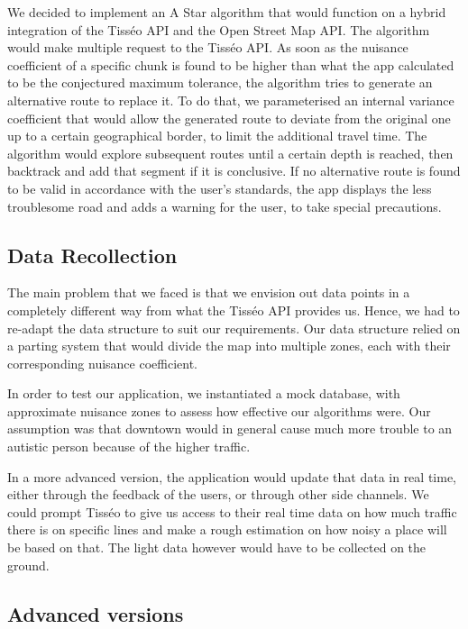We decided to implement an A Star algorithm that would function on a hybrid integration of the Tisséo API and the Open Street Map API. The algorithm would make multiple request to the Tisséo API. As soon as the nuisance coefficient of a specific chunk is found to be higher than what the app calculated to be the conjectured maximum tolerance, the algorithm tries to generate an alternative route to replace it. To do that, we parameterised an internal variance coefficient that would allow the generated route to deviate from the original one up to a certain geographical border, to limit the additional travel time. The algorithm would explore subsequent routes until a certain depth is reached, then backtrack and add that segment if it is conclusive. If no alternative route is found to be valid in accordance with the user's standards, the app displays the less troublesome road and adds a warning for the user, to take special precautions.

\newpage
\subsection{Data Recollection}

The main problem that we faced is that we envision out data points in a completely different way from what the Tisséo API provides us. Hence, we had to re-adapt the data structure to suit our requirements. Our data structure relied on a parting system that would divide the map into multiple zones, each with their corresponding nuisance coefficient.
\newline

In order to test our application, we instantiated a mock database, with approximate nuisance zones to assess how effective our algorithms were. Our assumption was that downtown would in general cause much more trouble to an autistic person because of the higher traffic.
\newline

In a more advanced version, the application would update that data in real time, either through the feedback of the users, or through other side channels. We could prompt Tisséo to give us access to their real time data on how much traffic there is on specific lines and make a rough estimation on how noisy a place will be based on that. The light data however would have to be collected on the ground.
\newline

\subsection{Advanced versions}


